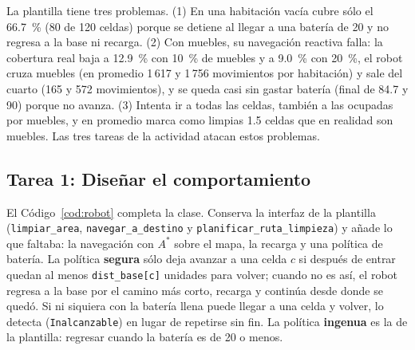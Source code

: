 \documentclass[11pt,letterpaper]{article}
\begin{document}
La plantilla tiene tres problemas. (1) En una habitación vacía cubre sólo el 66.7~\% (80 de 120 celdas) porque se detiene al llegar a una batería de 20 y no regresa a la base ni recarga. (2) Con muebles, su navegación reactiva falla: la cobertura real baja a 12.9~\% con 10~\% de muebles y a 9.0~\% con 20~\%, el robot cruza muebles (en promedio 1\,617 y 1\,756 movimientos por habitación) y sale del cuarto (165 y 572 movimientos), y se queda casi sin gastar batería (final de 84.7 y 90) porque no avanza. (3) Intenta ir a todas las celdas, también a las ocupadas por muebles, y en promedio marca como limpias 1.5 celdas que en realidad son muebles. Las tres tareas de la actividad atacan estos problemas.

\subsection{Tarea 1: Diseñar el comportamiento}

El Código~\ref{cod:robot} completa la clase. Conserva la interfaz de la plantilla (\texttt{limpiar\_area}, \texttt{navegar\_a\_destino} y \texttt{planificar\_ruta\_limpieza}) y añade lo que faltaba: la navegación con $A^*$ sobre el mapa, la recarga y una política de batería. La política \textbf{segura} sólo deja avanzar a una celda $c$ si después de entrar quedan al menos \texttt{dist\_base[c]} unidades para volver; cuando no es así, el robot regresa a la base por el camino más corto, recarga y continúa desde donde se quedó. Si ni siquiera con la batería llena puede llegar a una celda y volver, lo detecta (\texttt{Inalcanzable}) en lugar de repetirse sin fin. La política \textbf{ingenua} es la de la plantilla: regresar cuando la batería es de 20 o menos.
\end{document}
